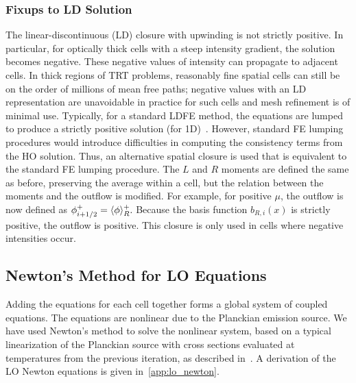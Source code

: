 \subsubsection{Fixups to LD Solution}

The linear-discontinuous (LD) closure with upwinding is not strictly positive.  In particular, for
optically thick cells with a steep intensity gradient, the solution becomes negative.
These negative values of intensity can propagate to adjacent cells. In thick regions of
TRT problems, reasonably fine spatial cells can still be on the order of millions of mean
free paths; negative values with an LD representation are unavoidable in practice for
such cells and mesh refinement is of minimal use.  Typically, for a standard LDFE method,
the equations are lumped to produce a strictly positive solution (for 1D)~\cite{morel_newton}. However, standard FE lumping
procedures would introduce difficulties in computing the consistency terms from the
HO solution.  Thus, an alternative spatial closure is used that is equivalent to the
standard FE lumping procedure.  The $L$ and $R$ moments are defined the same as before,
preserving the average within a cell, but the relation between the moments and
the outflow is modified.   For example, for positive $\mu$,
the outflow is now defined as $\phi^+_{i+1/2} = \langle \phi \rangle_R^+.$  Because the basis function $b_{R,i}(x)$ is strictly
positive, the outflow is positive.  This closure is only used
in cells where negative intensities occur.

\subsection{Newton's Method for LO Equations}

Adding the equations for each cell together forms a global system of coupled equations.
The equations are nonlinear due to the Planckian emission source.  
We have used Newton's method to solve the nonlinear system, based on a typical linearization of the Planckian source with cross
sections evaluated at temperatures from the previous iteration, as described
in~\cite{morel_newton}.  A derivation of the LO Newton equations is given
in~\ref{app:lo_newton}.

